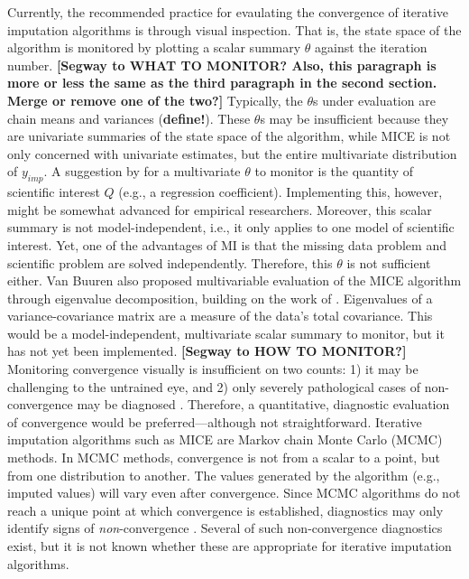 \documentclass[Royal,times,sageh]{sagej}
\begin{document}
Currently, the recommended practice for evaulating the convergence of iterative imputation algorithms is through visual inspection. That is, the state space of the algorithm is monitored by plotting a scalar summary \(\theta\) against the iteration number.
\textbf{{[}Segway to WHAT TO MONITOR? Also, this paragraph is more or less the same as the third paragraph in the second section. Merge or remove one of the two?{]}} Typically, the \(\theta\)s under evaluation are chain means and variances (\textbf{define!}). These \(\theta\)s may be insufficient because they are univariate summaries of the state space of the algorithm, while MICE is not only concerned with univariate estimates, but the entire multivariate distribution of \(y_{imp}\). A suggestion by \citet{buur18} for a multivariate \(\theta\) to monitor is the quantity of scientific interest \(Q\) (e.g., a regression coefficient). Implementing this, however, might be somewhat advanced for empirical researchers. Moreover, this scalar summary is not model-independent, i.e., it only applies to one model of scientific interest. Yet, one of the advantages of MI is that the missing data problem and scientific problem are solved independently. Therefore, this \(\theta\) is not sufficient either. Van Buuren \citeyearpar[\(\S\) 4.5.2]{buur18} also proposed multivariable evaluation of the MICE algorithm through eigenvalue decomposition, building on the work of \citet{mack03}. Eigenvalues of a variance-covariance matrix are a measure of the data's total covariance. This would be a model-independent, multivariate scalar summary to monitor, but it has not yet been implemented.
\textbf{{[}Segway to HOW TO MONITOR?{]}} Monitoring convergence visually is insufficient on two counts: 1) it may be challenging to the untrained eye, and 2) only severely pathological cases of non-convergence may be diagnosed \citep[\(\S\) 6.5.2]{buur18}. Therefore, a quantitative, diagnostic evaluation of convergence would be preferred---although not straightforward. Iterative imputation algorithms such as MICE are Markov chain Monte Carlo (MCMC) methods. In MCMC methods, convergence is not from a scalar to a point, but from one distribution to another. The values generated by the algorithm (e.g., imputed values) will vary even after convergence. Since MCMC algorithms do not reach a unique point at which convergence is established, diagnostics may only identify signs of \emph{non}-convergence \citep{hoff09}. Several of such non-convergence diagnostics exist, but it is not known whether these are appropriate for iterative imputation algorithms.
\end{document}
